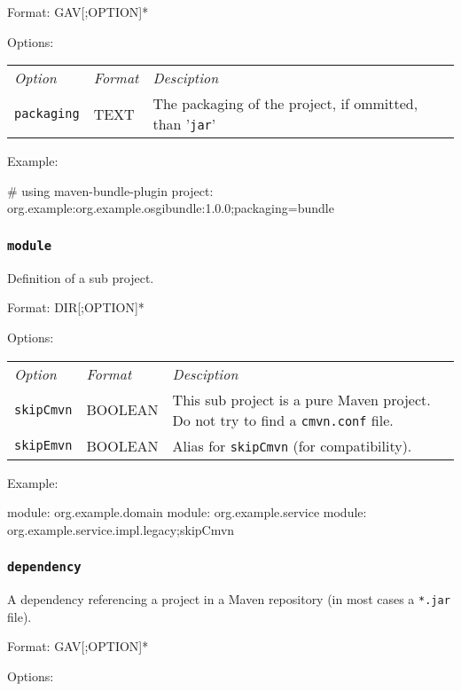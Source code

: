 \documentclass[a4paper,12pt,english,oneside,halfparskip]{scrartcl}
\newcommand{\code}[1]{\texttt{#1}}
\begin{document}
Format: GAV[;OPTION]*

Options:

\begin{tabular}{lll}
\emph{Option} & \emph{Format} & \emph{Desciption} \\
\code{packaging} & TEXT & The packaging of the project, if ommitted, than '\code{jar}'
\end{tabular}

Example:
\begin{Cmdline}
# using maven-bundle-plugin
project: org.example:org.example.osgibundle:1.0.0;packaging=bundle
\end{Cmdline}

\subsubsection{\code{module}}

Definition of a sub project.

Format: DIR[;OPTION]*

Options:

\begin{tabular}{llp{}}
\emph{Option} & \emph{Format} & \emph{Desciption} \\
\code{skipCmvn} & BOOLEAN & This sub project is a pure Maven project. Do not try to find a \code{cmvn.conf} file. \\
\code{skipEmvn} & BOOLEAN & Alias for \code{skipCmvn} (for compatibility). \\
\end{tabular}


Example:
\begin{Cmdline}
module: org.example.domain
module: org.example.service
module: org.example.service.impl.legacy;skipCmvn
\end{Cmdline}

\subsubsection{\code{dependency}}

A dependency referencing a project in a Maven repository (in most cases a \code{*.jar} file).

Format: GAV[;OPTION]*

Options:
\end{document}
